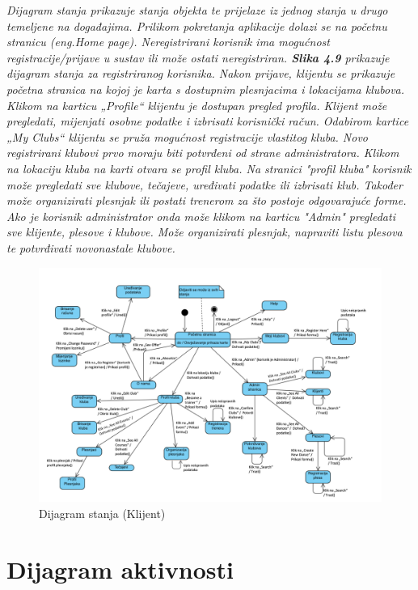 			\textit{ Dijagram stanja prikazuje stanja objekta te prijelaze iz jednog stanja u drugo temeljene na događajima. Prilikom pokretanja aplikacije dolazi se na početnu stranicu (eng.Home page). Neregistrirani korisnik ima mogućnost registracije/prijave u sustav ili može ostati neregistriran. \linebreak \textbf{Slika 4.9} prikazuje dijagram stanja za registriranog korisnika. Nakon prijave, klijentu se prikazuje početna stranica na kojoj je karta s dostupnim plesnjacima i lokacijama klubova. Klikom na karticu „Profile“  klijentu je dostupan pregled profila. Klijent može pregledati, mijenjati osobne podatke i izbrisati korisnički račun. Odabirom kartice „My Clubs“ klijentu se pruža mogućnost registracije vlastitog kluba. Novo registrirani klubovi prvo moraju biti potvrđeni od strane administratora. Klikom na lokaciju kluba na karti otvara se profil kluba. Na stranici "profil kluba" korisnik može pregledati sve klubove, tečajeve, uređivati podatke ili izbrisati klub. Također može organizirati plesnjak ili postati trenerom za što postoje odgovarajuće forme. Ako je korisnik administrator onda može klikom na karticu "Admin" pregledati sve klijente, plesove i klubove. Može organizirati plesnjak, napraviti listu plesova te potvrđivati novonastale klubove.}
			
			\begin{figure}[H]
				\centering
				\includegraphics[width=\textwidth]{slike/dijagram_stanja.png}
				\caption{Dijagram stanja (Klijent)}
				\label{fig:my_label}
		   	\end{figure}
			
		
			
			\section{Dijagram aktivnosti}
	
